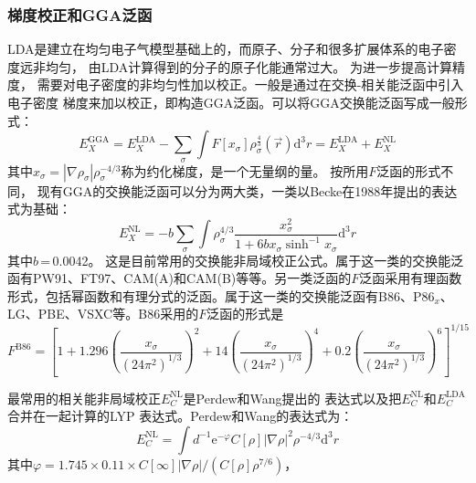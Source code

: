 \subsubsection{梯度校正和GGA泛函}
LDA是建立在均匀电子气模型基础上{的}，而原子、分子和很多扩展体系的电子密度远非均匀，%
由LDA计算得到的分子的原子化能{通常}过大。%
{为}进一步提高计算精度，%
需要对电子密度的非均匀性加以校正。一般是通过在交换-相关能泛函中引入电子密度%
梯度来加以校正{，}即构造GGA泛函。可以将GGA交换能泛函写成一般形式：
\begin{equation}
	E_X^{\mathrm{GGA}}=E_X^{\mathrm{\mathrm{LDA}}}-\sum_{\sigma}\int F[x_{\sigma}]\rho_{\sigma}^{\frac43}(\vec r)\textrm{d}^3r{=E_X^{\mathrm{LDA}}+E_X^{\mathrm{NL}}}
  \label{eq:dft-18}
\end{equation}
其中$x_{\sigma}=|\nabla\rho_{\sigma}|\rho_{\sigma}^{-4/3}$称为约化梯度，是一个无量纲的量。%
{按}所用$F${泛函}的形式不同，%
{现有}GGA的交换能泛函可以分为两大类，一类以Becke在1988年提出的表达式为基础：
\begin{equation}
  \label{eq:dft-9}
  E_X^{\mathrm{NL}}=-b\sum_{\sigma}\int\rho_{\sigma}^{4/3}\dfrac{x_{\sigma}^2}{1+6bx_{\sigma}\sinh^{-1}x_{\sigma}}\textrm{d}^3r
\end{equation}
其中$b$\,=\,0.0042{。}%
这是目前常用的交换能非局域校正公式。属于这一类的交换能泛函有PW91、FT97、CAM(A)和CAM(B)等等。另一类泛函的$F${泛函}采用有理函数{形式，}包括幂函数和有理分式的泛函。属于这一类的交换能泛函有B86、P86$_x$、LG、PBE、VSXC等。B86采用的$F${泛函}的形式是
\begin{equation}
	F^{\mathrm{B86}}=\left[1+1.296\left(\dfrac{x_{\sigma}}{(24\pi^2)^{1/3}}\right)^2+14\left(\dfrac{x_{\sigma}}{(24\pi^2)^{1/3}}\right)^4+0.2\left(\dfrac{x_{\sigma}}{(24\pi^2)^{1/3}}\right)^6\right]^{1/15}
  \label{eq:dft-19}
\end{equation}

最常用的相关能非局域校正{$E_C^{\mathrm{NL}}$}是Perdew和Wang提出的%
{表达}式以及把$E_C^{\mathrm{NL}}$和$E_C^{\mathrm{LDA}}$合{并}在一起计算的LYP%
{表达}式。Perdew和Wang的表达式为：
\begin{equation} 
  \label{eq:dft-10}
  E_C^{\mathrm{NL}}=\int{d^{-1}\textrm{e}^{-\varphi}C[\rho]|\nabla\rho|^2\rho^{-4/3}\textrm{d}^3r}
\end{equation}
其中$\varphi=1.745\times 0.11\times C[\infty]|\nabla\rho|/(C[\rho]\rho^{7/6})$，%

